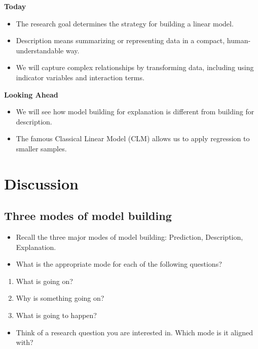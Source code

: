 \documentclass[
  letterpaper,
  DIV=11,
  numbers=noendperiod]{scrreprt}
\providecommand{\tightlist}{%
  \setlength{\itemsep}{0pt}\setlength{\parskip}{0pt}}\usepackage{longtable,booktabs,array}
\begin{document}
\textbf{Today}

\begin{itemize}
\item
  The research goal determines the strategy for building a linear model.
\item
  Description means summarizing or representing data in a compact,
  human-understandable way.
\item
  We will capture complex relationships by transforming data, including
  using indicator variables and interaction terms.
\end{itemize}

\textbf{Looking Ahead}

\begin{itemize}
\item
  We will see how model building for explanation is different from
  building for description.
\item
  The famous Classical Linear Model (CLM) allows us to apply regression
  to smaller samples.
\end{itemize}

\section{Discussion}\label{discussion}

\subsection{Three modes of model
building}\label{three-modes-of-model-building}

\begin{itemize}
\tightlist
\item
  Recall the three major modes of model building: Prediction,
  Description, Explanation.
\item
  What is the appropriate mode for each of the following questions?
\end{itemize}

\begin{enumerate}
\def\labelenumi{\arabic{enumi}.}
\tightlist
\item
  What is going on?
\item
  Why is something going on?
\item
  What is going to happen?
\end{enumerate}

\begin{itemize}
\tightlist
\item
  Think of a research question you are interested in. Which mode is it
  aligned with?
\end{itemize}
\end{document}
